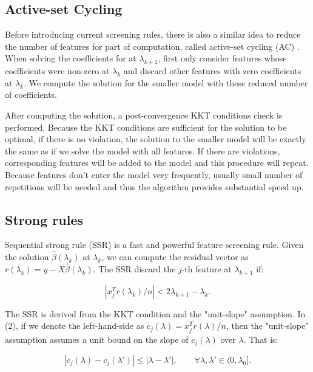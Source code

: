 \documentclass{article}
\begin{document}
\subsection{Active-set Cycling}

Before introducing current screening rules, there is also a similar idea to reduce the number of features for part of computation, called active-set cycling (AC) \cite{lee2007efficient}. When solving the coefficients for at $\lambda_{k+1}$, first only consider features whose coefficients were non-zero at $\lambda_k$ and discard other features with zero coefficients at $\lambda_k$. We compute the solution for the smaller model with these reduced number of coefficients.

After computing the solution, a post-convergence KKT conditions check is performed. Because the KKT conditions are sufficient for the solution to be optimal, if there is no violation, the solution to the smaller model will be exactly the same as if we solve the model with all features. If there are violations, corresponding features will be added to the model and this procedure will repeat. Because features don't enter the model very frequently, usually small number of repetitions will be needed and thus the algorithm provides substantial speed up.

\subsection{Strong rules}

Sequential strong rule (SSR) \cite{tibshirani2011regression} is a fast and powerful feature screening rule. Given the solution $\hat{\beta}(\lambda_k)$ at $\lambda_k$, we can compute the residual vector as $r(\lambda_k)=y-X\hat{\beta}(\lambda_k)$. The SSR discard the $j$-th feature at $\lambda_{k+1}$ if:

\begin{equation}
    |x_j^Tr(\lambda_k)/n|<2\lambda_{k+1}-\lambda_k.
\end{equation}

The SSR is derived from the KKT condition and the "unit-slope" assumption. In (2), if we denote the left-hand-side as $c_j(\lambda)=x_j^Tr(\lambda)/n$, then the "unit-slope" assumption assumes a unit bound on the slope of $c_j(\lambda)$ over $\lambda$. That is:

\begin{equation}
    |c_j(\lambda)-c_j(\lambda')|\leq |\lambda-\lambda'|,\qquad \forall \lambda,\lambda'\in(0,\lambda_0].
\end{equation}
\end{document}

